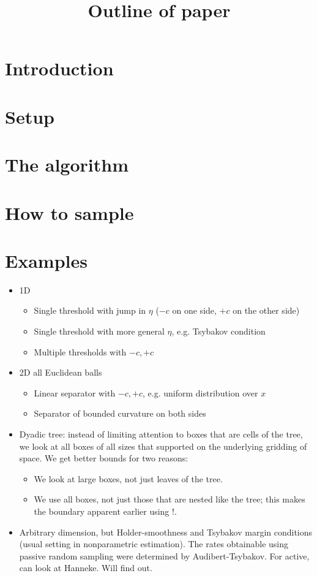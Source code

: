 \documentclass{article}
\title{Outline of paper}
\begin{document}
\maketitle
\section{Introduction}
\section{Setup}
\section{The algorithm}
\section{How to sample}
\section{Examples}
\begin{itemize}
    \item 1D
    \begin{itemize}
        \item Single threshold with jump in $\eta$ ($-c$ on one side, $+c$ on the other side)
        \item Single threshold with more general $\eta$, e.g. Tsybakov condition
        \item Multiple thresholds with $-c, +c$
    \end{itemize}
    \item 2D all Euclidean balls
    \begin{itemize}
        \item Linear separator with $-c, +c$, e.g. uniform distribution over $x$
        \item Separator of bounded curvature on both sides
    \end{itemize}
    \item Dyadic tree: instead of limiting attention to boxes that are cells of the tree, we look at all boxes of all sizes that supported on the underlying gridding of space. We get better bounds for two reasons:
    \begin{itemize}
        \item We look at large boxes, not just leaves of the tree.
        \item We use all boxes, not just those that are nested like the tree; this makes the boundary apparent earlier using !.
    \end{itemize}
    \item Arbitrary dimension, but Holder-smoothness and Tsybakov margin conditions (usual setting in nonparametric estimation). The rates obtainable using passive random sampling were determined by Audibert-Tsybakov. For active, can look at Hanneke. Will find out.
\end{itemize}
\end{document}
